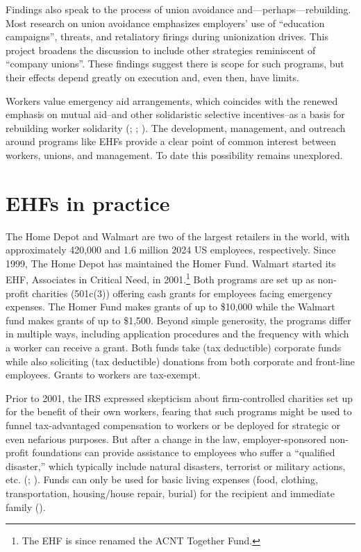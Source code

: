 \documentclass[
  11pt,
  oneside]{article}
\begin{document}
Findings also speak to the process of union avoidance and---perhaps---rebuilding. Most research on union avoidance emphasizes employers' use of ``education campaigns'', threats, and retaliatory firings during unionization drives. This project broadens the discussion to include other strategies reminiscent of ``company unions''. These findings suggest there is scope for such programs, but their effects depend greatly on execution and, even then, have limits.

Workers value emergency aid arrangements, which coincides with the renewed emphasis on mutual aid--and other solidaristic selective incentives--as a basis for rebuilding worker solidarity (; ; ). The development, management, and outreach around programs like EHFs provide a clear point of common interest between workers, unions, and management. To date this possibility remains unexplored.

\section{EHFs in practice}\label{ehfs-in-practice}

The Home Depot and Walmart are two of the largest retailers in the world, with approximately 420,000 and 1.6 million 2024 US employees, respectively. Since 1999, The Home Depot has maintained the Homer Fund. Walmart started its EHF, Associates in Critical Need, in 2001.\footnote{The EHF is since renamed the ACNT Together Fund.} Both programs are set up as non-profit charities (501c(3)) offering cash grants for employees facing emergency expenses. The Homer Fund makes grants of up to \$10,000 while the Walmart fund makes grants of up to \$1,500. Beyond simple generosity, the programs differ in multiple ways, including application procedures and the frequency with which a worker can receive a grant. Both funds take (tax deductible) corporate funds while also soliciting (tax deductible) donations from both corporate and front-line employees. Grants to workers are tax-exempt.

Prior to 2001, the IRS expressed skepticism about firm-controlled charities set up for the benefit of their own workers, fearing that such programs might be used to funnel tax-advantaged compensation to workers or be deployed for strategic or even nefarious purposes. But after a change in the law, employer-sponsored non-profit foundations can provide assistance to employees who suffer a ``qualified disaster,'' which typically include natural disasters, terrorist or military actions, etc. (; ). Funds can only be used for basic living expenses (food, clothing, transportation, housing/house repair, burial) for the recipient and immediate family ().
\end{document}
